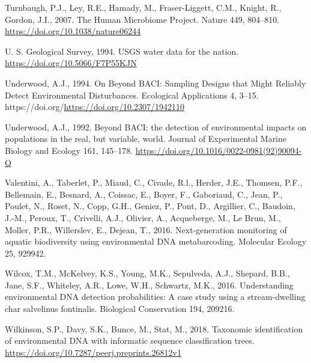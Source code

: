 \documentclass[
]{article}
\newlength{\cslhangindent}
\newlength{\cslentryspacingunit} %
\newenvironment{CSLReferences}[2] %
 {%
  \setlength{\parindent}{0pt}
  \ifodd #1
  \let\oldpar\par
  \def\par{\hangindent=\cslhangindent\oldpar}
  \fi
  \setlength{\parskip}{#2\cslentryspacingunit}
 }%
 {}
\begin{document}
\begin{CSLReferences}{1}{0}
\leavevmode{}%
Turnbaugh, P.J., Ley, R.E., Hamady, M., Fraser-Liggett, C.M., Knight,
R., Gordon, J.I., 2007. The Human Microbiome Project. Nature 449,
804--810. \url{https://doi.org/10.1038/nature06244}

\leavevmode{}%
U. S. Geological Survey, 1994. USGS water data for the nation.
\url{https://doi.org/10.5066/F7P55KJN}

\leavevmode{}%
Underwood, A.J., 1994. On Beyond BACI: Sampling Designs that Might
Reliably Detect Environmental Disturbances. Ecological Applications 4,
3--15. https://doi.org/\url{https://doi.org/10.2307/1942110}

\leavevmode{}%
Underwood, A.J., 1992. Beyond BACI: the detection of environmental
impacts on populations in the real, but variable, world. Journal of
Experimental Marine Biology and Ecology 161, 145--178.
\url{https://doi.org/10.1016/0022-0981(92)90094-Q}

\leavevmode{}%
Valentini, A., Taberlet, P., Miaud, C., Civade, R.l., Herder, J.E.,
Thomsen, P.F., Bellemain, E., Besnard, A., Coissac, E., Boyer, F.,
Gaboriaud, C., Jean, P., Poulet, N., Roset, N., Copp, G.H., Geniez, P.,
Pont, D., Argillier, C., Baudoin, J.-M., Peroux, T., Crivelli, A.J.,
Olivier, A., Acqueberge, M., Le Brun, M., Moller, P.R., Willerslev, E.,
Dejean, T., 2016. Next-generation monitoring of aquatic biodiversity
using environmental DNA metabarcoding. Molecular Ecology 25, 929942.

\leavevmode{}%
Wilcox, T.M., McKelvey, K.S., Young, M.K., Sepulveda, A.J., Shepard,
B.B., Jane, S.F., Whiteley, A.R., Lowe, W.H., Schwartz, M.K., 2016.
Understanding environmental DNA detection probabilities: A case study
using a stream-dwelling char salvelinus fontinalis. Biological
Conservation 194, 209216.

\leavevmode{}%
Wilkinson, S.P., Davy, S.K., Bunce, M., Stat, M., 2018. Taxonomic
identification of environmental DNA with informatic sequence
classification trees.
\url{https://doi.org/10.7287/peerj.preprints.26812v1}

\end{CSLReferences}
\end{document}
